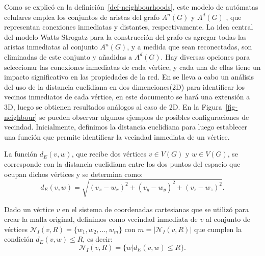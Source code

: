 Como se explicó en la definición~\ref{def-neighbourhoods}, este modelo de autómatas celulares emplea los conjuntos de aristas del grafo $A^n(G)$ y $A^d(G)$ , que representan conexiones inmediatas y distantes, respectivamente. La idea central del modelo Watts-Strogatz para la construcción del grafo es agregar todas las aristas inmediatas al conjunto $A^n(G)$, y a medida que sean reconectadas, son eliminadas de este conjunto y añadidas a $A^d(G)$. Hay diversas opciones para seleccionar las conexiones inmediatas de cada vértice, y cada una de ellas tiene un impacto significativo en las propiedades de la red. En \cite{viabarre2019} se lleva a cabo un an\'alisis del uso de la distancia euclidiana en dos dimenciones(2D) para identificar los vecinos inmediatos de cada v\'ertice, en este documento se har\'a una extensi\'on a 3D, luego se obtienen resultados an\'alogos al caso de 2D. En la Figura~\ref{fig-neighbour} se pueden observar algunos ejemplos de posibles configuraciones de vecindad. Inicialmente, definimos la distancia euclidiana para luego establecer una función que permite identificar la vecindad inmediata de un vértice.
 
\begin{definition}
\label{def-euclidean-distance}
La funci\'on $d_E(v,w)$, que recibe dos v\'ertices $v \in V(G)$ y $w \in V(G)$, se corresponde con la distancia euclidiana entre los dos puntos del espacio que ocupan dichos v\'ertices y se determina como:
\begin{equation}
d_E(v,w)=\sqrt{(v_x-w_x)^2 + (v_y-w_y)^2 + (v_z-w_z)^2}.
\end{equation}
\end{definition}

\begin{definition}
\label{def-neighbourhood-template}
Dado un v\'ertice $v$ en el sistema de coordenadas cartesianas que se utiliz\'o para crear la malla original, definimos como vecindad inmediata de $v$ al conjunto de v\'ertices $\mathcal{N}_I(v,R) = \lbrace w_1, w_2, \ldots, w_m \rbrace$ con $m=|\mathcal{N}_I(v,R)|$ que cumplen la condici\'on $d_E(v,w) \leq R$, es decir:
\begin{equation}
\mathcal{N}_I(v,R) = \lbrace w | d_E(v,w) \leq R \rbrace.
\end{equation}
\end{definition} 

